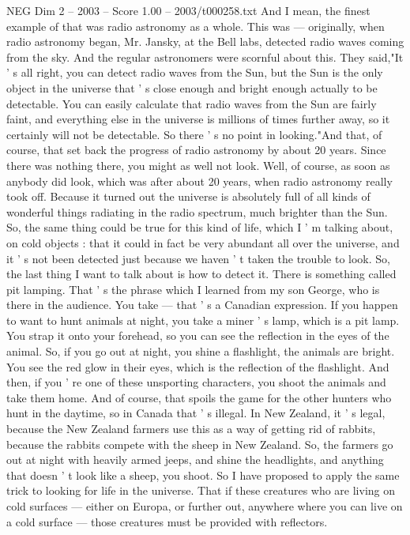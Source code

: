 \begin{textsample}{NEG Dim 2 – 2003 – Score 1.00 – 2003/t000258.txt}
And I mean, the finest example of that was radio astronomy as a whole.
This was — originally, when radio astronomy began, Mr.
Jansky, at the Bell labs, detected radio waves coming from the sky.
And the regular astronomers were scornful about this.
They said,"It ' s all right, you can detect radio waves from the Sun, but the Sun is the only object in the universe that ' s close enough and bright enough actually to be detectable.
You can easily calculate that radio waves from the Sun are fairly faint, and everything else in the universe is millions of times further away, so it certainly will not be detectable.
So there ' s no point in looking."And that, of course, that set back the progress of radio astronomy by about 20 years.
Since there was nothing there, you might as well not look.
Well, of course, as soon as anybody did look, which was after about 20 years, when radio astronomy really took off.
Because it turned out the universe is absolutely full of all kinds of wonderful things radiating in the radio spectrum, much brighter than the Sun.
So, the same thing could be true for this kind of life, which I ' m talking about, on cold objects : that it could in fact be very abundant all over the universe, and it ' s not been detected just because we haven ' t taken the trouble to look.
So, the last thing I want to talk about is how to detect it.
There is something called pit lamping.
That ' s the phrase which I learned from my son George, who is there in the audience.
You take — that ' s a Canadian expression.
If you happen to want to hunt animals at night, you take a miner ' s lamp, which is a pit lamp.
You strap it onto your forehead, so you can see the reflection in the eyes of the animal.
So, if you go out at night, you shine a flashlight, the animals are bright.
You see the red glow in their eyes, which is the reflection of the flashlight.
And then, if you ' re one of these unsporting characters, you shoot the animals and take them home.
And of course, that spoils the game for the other hunters who hunt in the daytime, so in Canada that ' s illegal.
In New Zealand, it ' s legal, because the New Zealand farmers use this as a way of getting rid of rabbits, because the rabbits compete with the sheep in New Zealand.
So, the farmers go out at night with heavily armed jeeps, and shine the headlights, and anything that doesn ' t look like a sheep, you shoot.
So I have proposed to apply the same trick to looking for life in the universe.
That if these creatures who are living on cold surfaces — either on Europa, or further out, anywhere where you can live on a cold surface — those creatures must be provided with reflectors.

\end{textsample}
